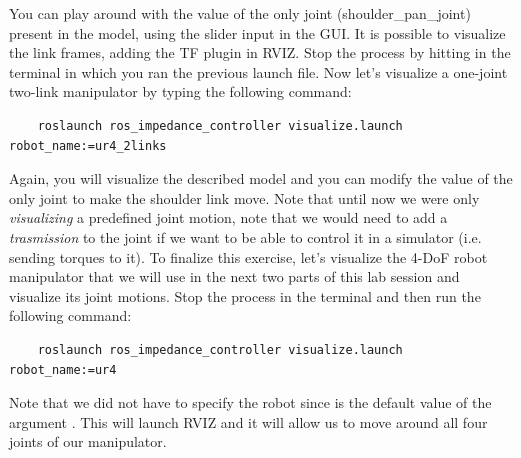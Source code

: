 \documentclass[11pt]{article}
\begin{document}
 You can play around with the value of the only joint (shoulder\_pan\_joint) present in the model, using the slider input in the GUI. It is possible to visualize the link frames, adding the TF plugin in RVIZ. Stop the process by hitting  in the terminal in which you ran the previous launch file. 
Now let's visualize a one-joint two-link manipulator by typing the following command:
%
%
\footnotesize
\begin{verbatim}
	roslaunch ros_impedance_controller visualize.launch robot_name:=ur4_2links  
\end{verbatim} 
\normalsize
Again, you will visualize the described model and you can modify the value of the only joint to make the shoulder link move. Note that until now we were only \textit{visualizing} a predefined joint motion, note that we would need to add a \textit{trasmission} to the joint if we want to be able to control it in a simulator (i.e. sending torques to it). To finalize this exercise, let's visualize the 4-DoF robot manipulator that we will use in the next two parts of this lab session and visualize its joint motions. Stop the process in the terminal and then run the following command:
%
%
\footnotesize
\begin{verbatim}
	roslaunch ros_impedance_controller visualize.launch robot_name:=ur4  
\end{verbatim} 
\normalsize
Note that we did not have to specify the robot since  is the default value of the argument . This will launch RVIZ and it will allow us to move around all four joints of our manipulator.\\
\end{document}
